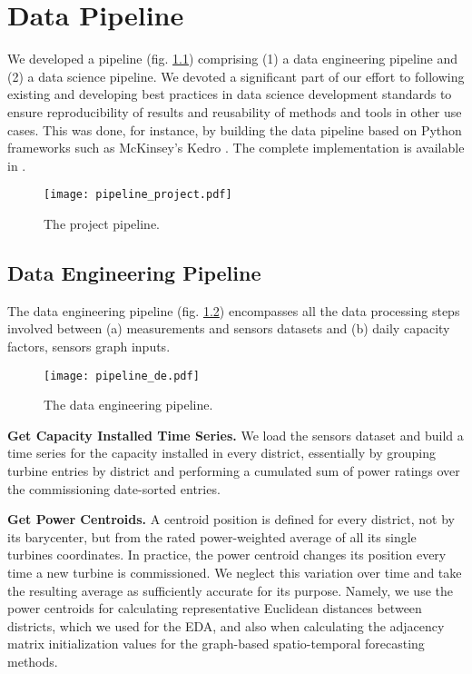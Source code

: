 \graphicspath{{./figures/pipeline/}}

\chapter{Data Pipeline}
We developed a pipeline (fig. \ref{fig:project_pipeline}) comprising (1) a data engineering pipeline and (2) a data science pipeline.
We devoted a significant part of our effort to following existing and developing best practices in data science development standards to ensure reproducibility of results and reusability of methods and tools in other use cases.
This was done, for instance, by building the data pipeline based on Python frameworks such as McKinsey's Kedro \cite{kedro}.
The complete implementation is available in \cite{windstfgithub}.

\begin{figure}[H]
   \centering
    \caption{The project pipeline.}
    \texttt{[image: pipeline\_project.pdf]}
   \label{fig:project_pipeline}
\end{figure}


\section{Data Engineering Pipeline}
The data engineering pipeline (fig. \ref{fig:pipeline_de}) encompasses all the data processing steps involved between (a) measurements and sensors datasets and (b) daily capacity factors, sensors graph inputs.

\begin{figure}[H]
   \centering
    \caption{The data engineering pipeline.}
    \texttt{[image: pipeline\_de.pdf]}
   \label{fig:pipeline_de}
\end{figure}

\vspace{1em}
\noindent
\textbf{Get Capacity Installed Time Series.}  We load the sensors dataset and build a time series for the capacity installed in every district, essentially by grouping turbine entries by district and performing a cumulated sum of power ratings over the commissioning date-sorted entries.

\vspace{1em}
\noindent
\textbf{Get Power Centroids.}  A centroid position is defined for every district, not by its barycenter, but from the rated power-weighted average of all its single turbines coordinates. In practice, the power centroid changes its position every time a new turbine is commissioned. We neglect this variation over time and take the resulting average as sufficiently accurate for its purpose. Namely, we use the power centroids for calculating representative Euclidean distances between districts, which we used for the EDA, and also when calculating the adjacency matrix initialization values for the graph-based spatio-temporal forecasting methods.

